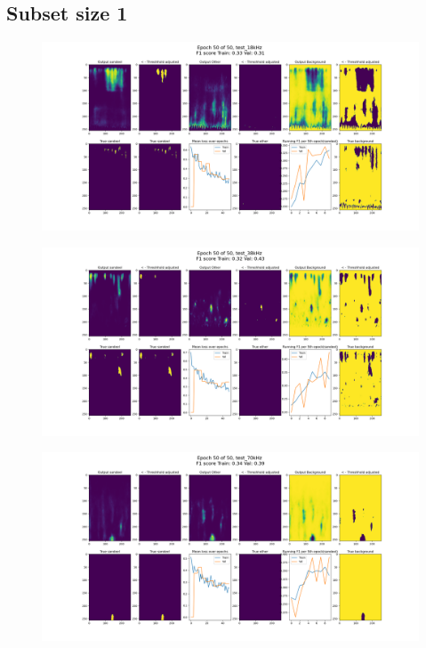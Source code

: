     \subsection{Subset size 1}
        \begin{figure}[H]

            \hspace*{-3.2cm}
            \includegraphics[scale=0.45]{figures/epoch_50_test_18kHz.png}

          	\medskip 
        \end{figure}
    \clearpage
        \begin{figure}[H]

            \hspace*{-3.2cm}
            \includegraphics[scale=0.45]{figures/epoch_50_test_38kHz.png}

          	\medskip 
        \end{figure}
    \clearpage
        \begin{figure}[H]

            \hspace*{-3.2cm}
            \includegraphics[scale=0.45]{figures/epoch_50_test_70kHz.png}

          	\medskip 
        \end{figure}
    \clearpage
